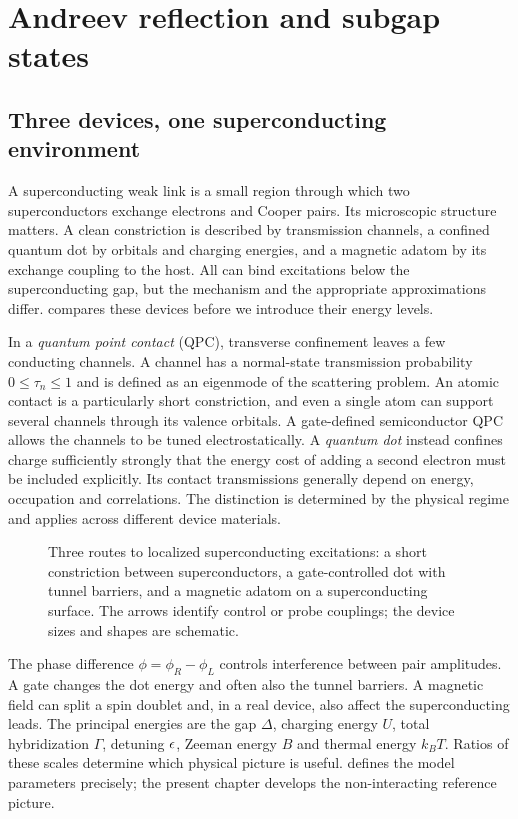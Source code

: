 \chapter{Andreev reflection and subgap states}\label{ch:background}

\section{Three devices, one superconducting environment}

A superconducting weak link is a small region through which two superconductors
exchange electrons and Cooper pairs. Its microscopic structure matters. A clean
constriction is described by transmission channels, a confined quantum dot by
orbitals and charging energies, and a magnetic adatom by its exchange coupling to
the host. All can bind excitations below the superconducting gap, but the mechanism
and the appropriate approximations differ.  compares these
devices before we introduce their energy levels.

In a \emph{quantum point contact} (QPC), transverse confinement leaves a few
conducting channels. A channel has a normal-state transmission probability
$0\le\tau_n\le1$ and is defined as an eigenmode of the scattering problem.
An atomic contact is a particularly short constriction, and even a single
atom can support several channels through its valence orbitals. A gate-defined
semiconductor QPC allows the channels to be tuned electrostatically. A
\emph{quantum dot} instead confines charge sufficiently strongly that the energy
cost of adding a second electron must be included explicitly. Its contact
transmissions generally depend on energy, occupation and correlations. The
distinction is determined by the physical regime and applies across different
device materials.

\begin{figure}[htb]
\centering{}
\caption{Three routes to localized superconducting excitations: a short
constriction between superconductors, a gate-controlled dot with tunnel barriers,
and a magnetic adatom on a superconducting surface. The arrows identify control
or probe couplings; the device sizes and shapes are schematic.}
\label{fig:primer-devices}
\end{figure}

The phase difference $\phi=\phi_R-\phi_L$ controls interference between pair
amplitudes. A gate changes the dot energy and often also the tunnel barriers. A
magnetic field can split a spin doublet and, in a real device, also affect the
superconducting leads. The principal energies are the gap $\Delta$, charging
energy $U$, total hybridization $\Gamma$, detuning $\epsilon$, Zeeman energy $B$ and
thermal energy $k_BT$. Ratios of these scales determine which physical picture is
useful.  defines the model parameters precisely; the present
chapter develops the non-interacting reference picture.

